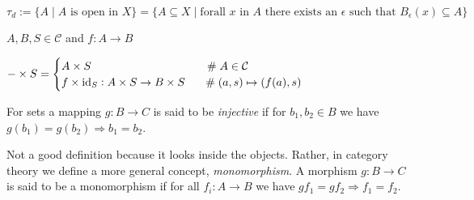 \documentclass[11pt, oneside]{article}   	%
\begin{document}
\begin{equation*}
\tau_d := \{A \mid \text {$A$ is open in $X$} \} = \{A \subseteq X \mid \text{forall $x$ in $A$ there exists an $\epsilon$ such that $B_{\epsilon}(x) \subseteq A$}\}
\end{equation*}

\vspace{5.0em}
\bigskip
\bigskip



\vspace{5em}

\noindent
$A,B,S \in \mathcal{C}$ and $f: A \to B$


\bigskip
\begin{math}
- \times S =
\begin{cases} 
    A \times S  \hspace{10em} \mathrel{\#} A \in \mathcal{C} \\ 
    f \times \text{id}_{S}: A \times S \to B \times S \hspace{1.55em} \mathrel{\#} (a,s) \mapsto (f(a),s)
\end{cases}
\end{math}

\bigskip
\bigskip
%
%

\bigskip
\noindent
For sets a mapping $g:B \to C$ is said to be \emph{injective}
if for $b_{1}, b_{2} \in B$ we have $g(b_{1}) = g(b_{2}) \Rightarrow b_{1} = b_{2}$.

\bigskip
\noindent
Not a good definition because it looks inside the objects. Rather, in category
theory we define a more general concept, \emph{monomorphism}. A morphism $g:B \to C$
is said to be a monomorphism if for all $f_{i}: A \to B$ we have $gf_{1} 
= gf_{2} \Rightarrow f_{1} = f_{2}$.
\end{document}
